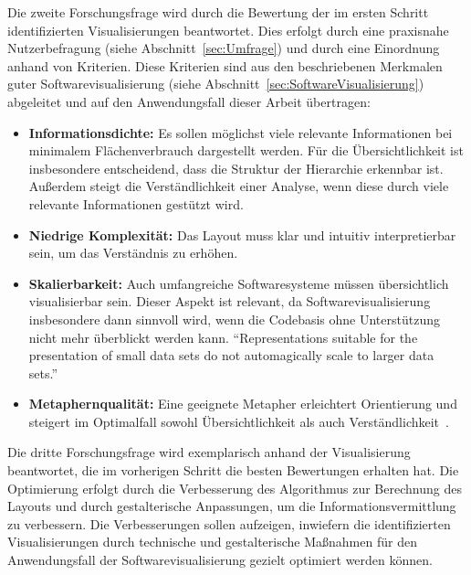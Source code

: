 Die zweite Forschungsfrage wird durch die Bewertung der im ersten Schritt identifizierten Visualisierungen beantwortet. Dies erfolgt durch eine praxisnahe Nutzerbefragung (siehe Abschnitt~\ref{sec:Umfrage}) und durch eine Einordnung anhand von Kriterien. Diese Kriterien sind aus den beschriebenen Merkmalen guter Softwarevisualisierung (siehe Abschnitt~\ref{sec:SoftwareVisualisierung}) abgeleitet und auf den Anwendungsfall dieser Arbeit übertragen:
\begin{itemize}
    \item \textbf{Informationsdichte:} Es sollen möglichst viele relevante Informationen bei minimalem Flächenverbrauch dargestellt werden. Für die Übersichtlichkeit ist insbesondere entscheidend, dass die Struktur der Hierarchie erkennbar ist. Außerdem steigt die Verständlichkeit einer Analyse, wenn diese durch viele relevante Informationen gestützt wird.
    \item \textbf{Niedrige Komplexität:} Das Layout muss klar und intuitiv interpretierbar sein, um das Verständnis zu erhöhen.
    \item \textbf{Skalierbarkeit:} Auch umfangreiche Softwaresysteme müssen übersichtlich visualisierbar sein. Dieser Aspekt ist relevant, da Softwarevisualisierung insbesondere dann sinnvoll wird, wenn die Codebasis ohne Unterstützung nicht mehr überblickt werden kann. \enquote{Representations suitable for the presentation of small data sets do not automagically scale to larger data sets.}~\cite[161]{johnson1993treemapsPhd}
    \item \textbf{Metaphernqualität:} Eine geeignete Metapher erleichtert Orientierung und steigert im Optimalfall sowohl Übersichtlichkeit als auch Verständlichkeit~\cite{virtualButVisibleMunro}.
\end{itemize}

Die dritte Forschungsfrage wird exemplarisch anhand der Visualisierung beantwortet, die im vorherigen Schritt die besten Bewertungen erhalten hat. Die Optimierung erfolgt durch die Verbesserung des Algorithmus zur Berechnung des Layouts und durch gestalterische Anpassungen, um die Informationsvermittlung zu verbessern. Die Verbesserungen sollen aufzeigen, inwiefern die identifizierten Visualisierungen durch technische und gestalterische Maßnahmen für den Anwendungsfall der Softwarevisualisierung gezielt optimiert werden können.